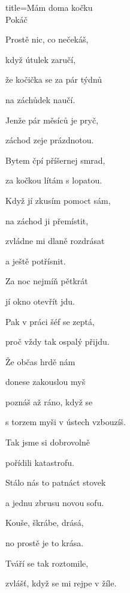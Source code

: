 \begin{song}{title=\predtitle\centering Mám doma kočku\\\large Pokáč \vspace*{-0.7cm}}
{\begin{varwidth}[t]{0.48\textwidth}
\sloka
   Prostě nic, co nečekáš,

   když útulek zaručí,

   že kočička se za pár týdnů

   na záchůdek naučí.


\end{varwidth}\mezisloupci\begin{varwidth}[t]{0.5\textwidth}\setlength{\parindent}{0.45cm}\vspace*{0.65cm}  %

\sloka
   Jenže pár měsíců je pryč,

   záchod zeje prázdnotou.

   Bytem čpí příšernej smrad,

   za kočkou lítám s lopatou.


\sloka
   Když jí zkusím pomoct sám,

   na záchod ji přemístit,

   zvládne mi dlaně rozdrásat

   a ještě potřísnit.

\vspace*{-0.2cm}


\vspace*{-0.2cm}

\sloka
   Za noc nejmíň pětkrát

   jí okno otevřít jdu.

   Pak v práci šéf se zeptá,

   proč vždy tak ospalý přijdu.


\sloka
   Že občas hrdě nám

   donese zakouslou myš

   poznáš až ráno, když se

   s torzem myši v ústech vzbouzíš.


\sloka
   Tak jsme si dobrovolně

   pořídili katastrofu.

   Stálo nás to patnáct stovek

   a jednu zbrusu novou sofu.


\sloka
   Kouše, škrábe, drásá,

   no prostě je to krása.

   Tváří se tak roztomile,

   zvlášť, když se mi rejpe v žíle.

\vspace*{-0.2cm}


\end{varwidth}}
\end{song}
